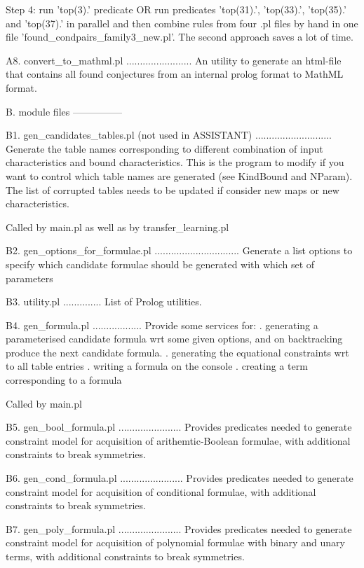   Step 4: run 'top(3).' predicate OR run predicates 'top(31).', 'top(33).', 'top(35).'
          and 'top(37).' in parallel and then combine rules from four .pl files by hand in
          one file 'found_condpairs_family3_new.pl'. The second approach saves a lot of time.

A8. convert_to_mathml.pl
........................
 An utility to generate an html-file that contains all found conjectures from
 an internal prolog format to MathML format. 



B. module files
---------------

B1. gen_candidates_tables.pl (not used in ASSISTANT)
............................
 Generate the table names corresponding to different combination of input characteristics
 and bound characteristics. This is the program to modify if you want to control which
 table names are generated (see KindBound and NParam).
 The list of corrupted tables needs to be updated if consider new maps or new characteristics.

 Called by main.pl as well as by transfer_learning.pl 


B2. gen_options_for_formulae.pl
...............................
 Generate a list options to specify which candidate formulae should be generated with which set of parameters


B3. utility.pl
..............
 List of Prolog utilities.


B4. gen_formula.pl
..................
 Provide some services for:
  . generating a parameterised candidate formula wrt some given options,
    and on backtracking produce the next candidate formula.
  . generating the equational constraints wrt to all table entries
  . writing a formula on the console
  . creating a term corresponding to a formula

 Called by main.pl
 
B5. gen_bool_formula.pl
.......................
 Provides predicates needed to generate constraint model for acquisition of
 arithemtic-Boolean formulae, with additional constraints
 to break symmetries.
 
B6. gen_cond_formula.pl
.......................
 Provides predicates needed to generate constraint model for acquisition of
 conditional formulae, with additional constraints
 to break symmetries.

B7. gen_poly_formula.pl
.......................
 Provides predicates needed to generate constraint model for acquisition of
 polynomial formulae with binary and unary terms, with additional constraints
 to break symmetries.

